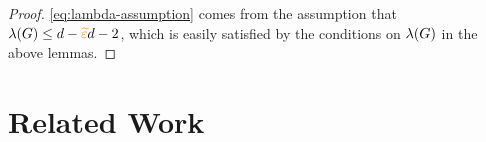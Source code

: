 \documentclass[11pt]{article}
\begin{document}
\begin{proof}
\eqref{eq:lambda-assumption} comes from the assumption that $\lambda(G) \leq d - \textcolor{orange}{\widetilde{\varepsilon}} d - 2$, which is easily satisfied by the conditions on $\lambda(G)$ in the above lemmas.

\end{proof}

\section{Related Work}
\label{sec:related-work}

\clearpage


\end{document}
